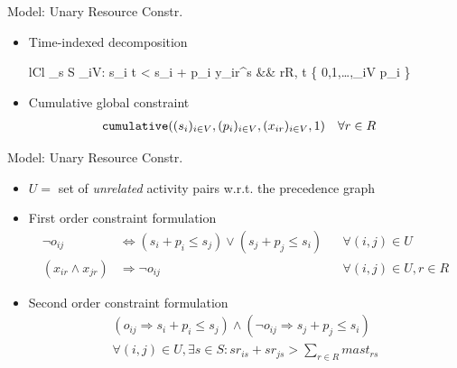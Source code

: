 \documentclass{beamer}
\begin{document}
\begin{frame}{Model: Unary Resource Constr.}
	\begin{itemize}
		\item Time-indexed decomposition
		\begin{IEEEeqnarray}{lCl}
		    \sum\nolimits_{s \in  S} \sum\nolimits_{i\in V: s_i \leq t < s_i + p_i} y_{ir}^s  
		    &\hspace{2mm}& \forall r\in R, \forall t \in \left\{ 0,1,\ldots,\sum\nolimits_{i\in V} p_i \right\} \nonumber
		\end{IEEEeqnarray}\pause
		\vspace{3mm}
		\item Cumulative global constraint
		\begin{align}
		    & {\tt cumulative}((s_{i})_{i\in V}, (p_{i})_{i\in V}, 
		        (x_{ir})_{i\in V}, 1)
		    && \forall r\in R \nonumber
		\end{align}
	\end{itemize}
\end{frame}

\begin{frame}{Model: Unary Resource Constr.}
	\begin{itemize}
		\item $U=$ set of \emph{unrelated} activity pairs w.r.t. the precedence graph
		\item First order constraint formulation
		\begin{align}
		    \neg o_{ij} 
		    & \Leftrightarrow (s_{i} + p_{i} \leq s_{j}) \vee (s_{j} + p_{j} \leq s_{i})
		    && \forall (i, j) \in U \nonumber\\
		    (x_{ir} \wedge x_{jr}) 
		    & \Rightarrow \neg o_{ij}
		    && \forall (i, j) \in U, r\in R\nonumber
		\end{align}\pause
		\vspace{3mm}
		\item Second order constraint formulation
		\begin{multline}
		    (o_{ij} \Rightarrow s_i + p_{i} \leq s_{j}) \wedge
		    (\neg o_{ij} \Rightarrow s_{j} + p_{j} \leq s_{i})
		    \\
		    \forall (i, j) \in U, \exists s\in S: 
		        sr_{is} + sr_{js} > \sum\nolimits_{r\in R} mast_{rs}\nonumber
		\end{multline}
	\end{itemize}
\end{frame}


\end{document}
